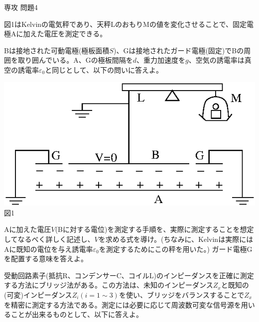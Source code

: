 \documentclass[fleqn]{jbook}
\begin{document}
\begin{question}{専攻 問題4}{}
\begin{subquestions}
\SubQuestion
 図1はKelvinの電気秤であり、天秤LのおもりMの値を変化させることで、固定電極Aに加えた電圧を測定できる。



\begin{minipage}{.5\linewidth}
Bは接地された可動電極(極板面積$S$)、Gは接地されたガード電極(固定)でBの周囲を取り囲んでいる。A、Gの極板間隔を$d$、重力加速度を$g$、空気の誘電率は真空の誘電率$\varepsilon_{0}$と同じとして、以下の問いに答えよ。
\end{minipage}
\hspace*{.05\linewidth}
\begin{minipage}{.45\linewidth}
\begin{center}
\includegraphics[clip,width=\linewidth]{1999phy4-1.eps}\\
図1
\end{center}
\end{minipage}

\begin{subsubquestions}
\SubSubQuestion
Aに加えた電圧$V$(Bに対する電位)を測定する手順を、実際に測定することを想定してなるべく詳しく記述し、$V$を求める式を導け。(ちなみに、Kelvinは実際にはAに既知の電位を与え誘電率$\varepsilon_{0}$を測定するためにこの秤を用いた。)
\SubSubQuestion
ガード電極Gを配置する意味を答えよ。

\end{subsubquestions}

\SubQuestion
受動回路素子(抵抗R、コンデンサーC、コイルL)のインピーダンスを正確に測定する方法にブリッジ法がある。この方法は、未知のインピーダンス$Z_{x}$と既知の(可変)インピーダンス$Z_{i}(i=1\sim 3)$を使い、ブリッジをバランスすることで$Z_{x}$を精密に測定する方法である。測定には必要に応じて周波数可変な信号源を用いることが出来るものとして、以下に答えよ。


\end{subquestions}
\end{question}
\end{document}
